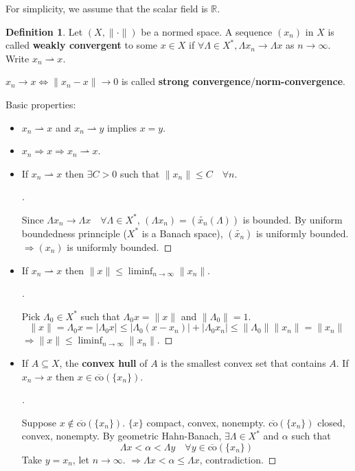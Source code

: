 \documentclass{article}
\theoremstyle{definition}
\newtheorem{dfn}{Definition}
\newenvironment{proofs}[1][\proofname]{%
  \begin{proof}[#1]$ $\par\nobreak\ignorespaces
}{%
  \end{proof}
}
\newcommand{\RR}{\mathbb R}
\newcommand{\ra}{\rightarrow}
\newcommand{\Ra}{\Rightarrow}
\begin{document}
For simplicity, we assume that the scalar field is $\RR$.

\begin{dfn}
	Let $(X, \|\cdot\|)$ be a normed space.
	A sequence $(x_n)$ in $X$ is called \textbf{weakly convergent} to some $x \in X$ if $\forall \Lambda \in X^*, \Lambda x_n \to \Lambda x$ as $n \to \infty$.
	Write $x_n \rightharpoonup x$.
\end{dfn}

$x_n \to x \Leftrightarrow \|x_n - x \| \to 0$ is called \textbf{strong convergence}/\textbf{norm-convergence}.

\par Basic properties:
\begin{itemize}
	\item $x_n \rightharpoonup x$ and $x_n \rightharpoonup y$ implies $x = y$.

	\item $x_n \Rightarrow x \Rightarrow x_n \rightharpoonup x$.

	\item If $x_n \rightharpoonup x$ then $\exists C > 0$ such that $\|x_n\| \leq C \quad \forall n$.
		\begin{proofs}
			Since $\Lambda x_n \to \Lambda x \quad \forall \Lambda \in X^*$, $(\Lambda x_n) = (\tilde{x_n}(\Lambda))$ is bounded.
			By uniform boundedness prinnciple ($X^*$ is a Banach space), $(\tilde{x_n})$ is uniformly bounded.
			$\Rightarrow (x_n)$ is uniformly bounded.
		\end{proofs}

	\item If $x_n \rightharpoonup x$ then $\|x\| \leq \liminf_{n \to \infty} \|x_n\|$.
		\begin{proofs}
			Pick $\Lambda_0 \in X^*$ such that $\Lambda_0 x = \|x\|$ and $\|\Lambda_0\| = 1$.
			\[
				\|x\| = \Lambda_0 x = |\Lambda_0 x| \leq |\Lambda_0 (x - x_n)| + |\Lambda_0 x_n| \leq \|\Lambda_0 \| \|x_n \| = \|x_n\|
			\]
			$\Ra \|x\| \leq \liminf_{n \to \infty} \|x_n\|$.
		\end{proofs}

	\item If $A \subseteq X$, the \textbf{convex hull} of $A$ is the smallest convex set that contains $A$.
		If $x_n \ra x$ then $x \in \overline{\text{co}}(\{x_n\})$.
		\begin{proofs}
			Suppose $x \notin \overline{\text{co}}(\{x_n\})$.
			$\{x\}$ compact, convex, nonempty.
			$\overline{\text{co}}(\{x_n\})$ closed, convex, nonempty.
			By geometric Hahn-Banach, $\exists \Lambda \in X^*$ and $\alpha$ such that 
			\[
				\Lambda x < \alpha < \Lambda y \quad \forall y \in \overline{\text{co}}(\{x_n\})
			\]
			Take $y = x_n$, let $n \to \infty$.
			$\Rightarrow \Lambda x < \alpha \leq \Lambda x$, contradiction.
		\end{proofs}
\end{itemize}
\end{document}
